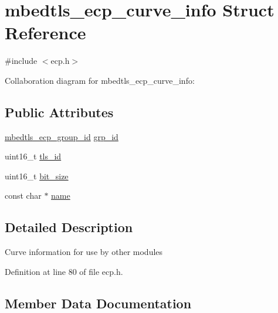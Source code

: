\hypertarget{structmbedtls__ecp__curve__info}{}\section{mbedtls\+\_\+ecp\+\_\+curve\+\_\+info Struct Reference}
\label{structmbedtls__ecp__curve__info}


{\ttfamily \#include $<$ecp.\+h$>$}



Collaboration diagram for mbedtls\+\_\+ecp\+\_\+curve\+\_\+info\+:
\subsection*{Public Attributes}
\begin{DoxyCompactItemize}
\item 
\mbox{\hyperlink{ecp_8h_af79e530ea8f8416480f805baa20b1a2d}{mbedtls\+\_\+ecp\+\_\+group\+\_\+id}} \mbox{\hyperlink{structmbedtls__ecp__curve__info_a1fdb81fb58ed6039b5c9fe1a3c82852b}{grp\+\_\+id}}
\item 
uint16\+\_\+t \mbox{\hyperlink{structmbedtls__ecp__curve__info_ac2754d3ed70b7cc54ba3567372763551}{tls\+\_\+id}}
\item 
uint16\+\_\+t \mbox{\hyperlink{structmbedtls__ecp__curve__info_a893162d86716513661ccb05b4a450af1}{bit\+\_\+size}}
\item 
const char $\ast$ \mbox{\hyperlink{structmbedtls__ecp__curve__info_a123ba197ecf3a5573e28030393f7b1dd}{name}}
\end{DoxyCompactItemize}


\subsection{Detailed Description}
Curve information for use by other modules 

Definition at line 80 of file ecp.\+h.



\subsection{Member Data Documentation}
\mbox{\label{structmbedtls__ecp__curve__info_a893162d86716513661ccb05b4a450af1}} 
